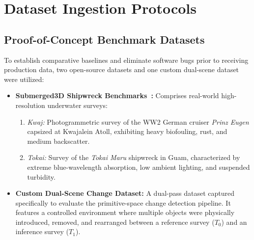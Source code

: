 \section{Dataset Ingestion Protocols}
\label{sec:dataset_protocol}

\subsection{Proof-of-Concept Benchmark Datasets}
To establish comparative baselines and eliminate software bugs prior to receiving production data, two open-source datasets and one custom dual-scene dataset were utilized:
\begin{itemize}
    \item \textbf{Submerged3D Shipwreck Benchmarks~\cite{11128502}:} Comprises real-world high-resolution underwater surveys:
    \begin{enumerate}
        \item \textit{Kwaj:} Photogrammetric survey of the WW2 German cruiser \textit{Prinz Eugen} capsized at Kwajalein Atoll, exhibiting heavy biofouling, rust, and medium backscatter.
        \item \textit{Tokai:} Survey of the \textit{Tokai Maru} shipwreck in Guam, characterized by extreme blue-wavelength absorption, low ambient lighting, and suspended turbidity.
    \end{enumerate}
    \item \textbf{Custom Dual-Scene Change Dataset:} A dual-pass dataset captured specifically to evaluate the primitive-space change detection pipeline. It features a controlled environment where multiple objects were physically introduced, removed, and rearranged between a reference survey ($T_0$) and an inference survey ($T_1$).
\end{itemize}

